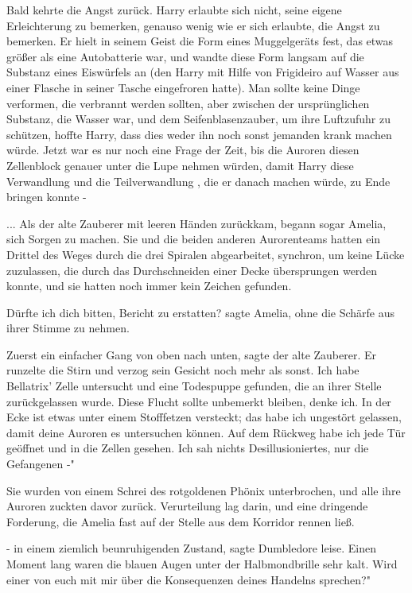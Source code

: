 Bald kehrte die Angst zurück. Harry erlaubte sich nicht, seine eigene
Erleichterung zu bemerken, genauso wenig wie er sich erlaubte, die Angst zu
bemerken. Er hielt in seinem Geist die Form eines Muggelgeräts fest, das etwas
größer als eine Autobatterie war, und wandte diese Form langsam auf die Substanz
eines Eiswürfels an (den Harry mit Hilfe von Frigideiro auf Wasser aus einer
Flasche in seiner Tasche eingefroren hatte). Man sollte keine Dinge verformen,
die verbrannt werden sollten, aber zwischen der ursprünglichen Substanz, die
Wasser war, und dem Seifenblasenzauber, um ihre Luftzufuhr zu schützen, hoffte
Harry, dass dies weder ihn noch sonst jemanden krank machen würde. Jetzt war es
nur noch eine Frage der Zeit, bis die Auroren diesen Zellenblock genauer unter
die Lupe nehmen würden, damit Harry diese Verwandlung und die Teilverwandlung ,
die er danach machen würde, zu Ende bringen konnte -

... Als der alte Zauberer mit leeren Händen zurückkam, begann sogar Amelia, sich
Sorgen zu machen. Sie und die beiden anderen Aurorenteams hatten ein Drittel des
Weges durch die drei Spiralen abgearbeitet, synchron, um keine Lücke zuzulassen,
die durch das Durchschneiden einer Decke übersprungen werden konnte, und sie
hatten noch immer kein Zeichen gefunden.

\glqq Dürfte ich dich bitten, Bericht zu erstatten?\grqq{} sagte Amelia, ohne
die Schärfe aus ihrer Stimme zu nehmen.

\glqq Zuerst ein einfacher Gang von oben nach unten\grqq{}, sagte der alte
Zauberer. Er runzelte die Stirn und verzog sein Gesicht noch mehr als sonst.
\glqq Ich habe Bellatrix' Zelle untersucht und eine Todespuppe gefunden, die an
ihrer Stelle zurückgelassen wurde. Diese Flucht sollte unbemerkt bleiben, denke
ich. In der Ecke ist etwas unter einem Stofffetzen versteckt; das habe ich
ungestört gelassen, damit deine Auroren es untersuchen können. Auf dem Rückweg
habe ich jede Tür geöffnet und in die Zellen gesehen. Ich sah nichts
Desillusioniertes, nur die Gefangenen -"

Sie wurden von einem Schrei des rotgoldenen Phönix unterbrochen, und alle ihre
Auroren zuckten davor zurück. Verurteilung lag darin, und eine dringende
Forderung, die Amelia fast auf der Stelle aus dem Korridor rennen ließ.

\glqq - in einem ziemlich beunruhigenden Zustand\grqq{}, sagte Dumbledore leise.
Einen Moment lang waren die blauen Augen unter der Halbmondbrille sehr kalt.
\glqq Wird einer von euch mit mir über die Konsequenzen deines Handelns
sprechen?"

